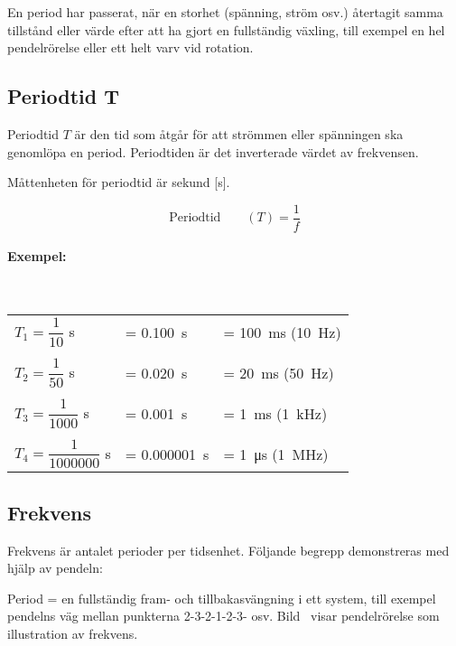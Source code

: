 En period har passerat, när en storhet (spänning, ström osv.) återtagit samma
tillstånd eller värde efter att ha gjort en fullständig växling, till exempel en
hel pendelrörelse eller ett helt varv vid rotation.

\newpage
\subsection{Periodtid T}

Periodtid \(T\) är den tid som åtgår för att strömmen eller spänningen ska
genomlöpa en period. Periodtiden är det inverterade värdet av frekvensen.

Måttenheten för periodtid är sekund [s].

$$\text{Periodtid} \qquad (T) = \dfrac{1}{f}$$

\noindent
\paragraph{Exempel:}~\\[1ex]
\begin{small}
\begin{tabular}{@{}lll}
\(T_1=\dfrac{1}{10}\) s & = \qty{0,100}{\second} & = \qty{100}{\milli\second} (\qty{10}{\hertz})\\
\\
\(T_2=\dfrac{1}{50}\) s & = \qty{0,020}{\second} & = \qty{20}{\milli\second} (\qty{50}{\hertz})\\
\\
\(T_3=\dfrac{1}{1000}\) s & = \qty{0,001}{\second} & = \qty{1}{\milli\second} (\qty{1}{\kilo\hertz})\\
\\
\(T_4=\dfrac{1}{1000000}\) s & = \qty{0,000001}{\second} & = \qty{1}{\micro\second} (\qty{1}{\mega\hertz})\\
\end{tabular}
\end{small}

\subsection{Frekvens}
\label{frekvens}

Frekvens är antalet perioder per tidsenhet.
Följande begrepp demonstreras med hjälp av pendeln:

Period = en fullständig fram- och tillbakasvängning i ett system, till exempel
pendelns väg mellan punkterna 2-3-2-1-2-3- osv.
Bild~ visar pendelrörelse som illustration av frekvens.

